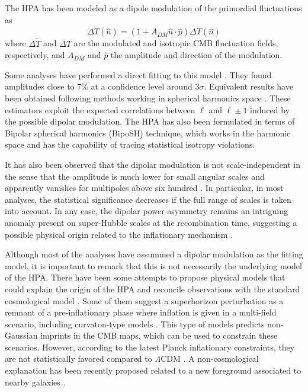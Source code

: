 The HPA has been modeled as a dipole modulation of the primordial fluctuations \cite{2005PhRvD..72j3002G, 2007ApJ...656..636G} as
%
\begin{equation}\label{DM}
    \Delta{\tilde{T}}(\hat{n}) = (1+A_{DM}\hat{n}\cdot\hat{p})\Delta{T}(\hat{n})
\end{equation}
%
where $\Delta{\tilde{T}}$ and $\Delta{T}$ are the modulated and isotropic CMB fluctuation fields, respectively, and $A_{DM}$ and $\hat{p}$ the amplitude and direction of the modulation.

Some analyses have 
performed a direct fitting
to this model \cite{2009ApJ...699..985H, 2007ApJ...660L..81E, 2014A&A...571A..23P, 2017PhRvD..95f3011Z}. They found amplitudes close to 7\% 
at a confidence level
around 3$\sigma$. Equivalent results have been obtained following methods working in 
spherical harmonics space \cite{2015PhRvD..91b3515R, 2009PhRvD..80f3004H, 2016JCAP...01..046G, 2016A&A...594A..16P}. These estimators exploit the expected correlations between $\ell$ and $\ell\pm 1$ induced by the possible dipolar modulation. The HPA has also been formulated in terms of Bipolar spherical harmonics (BipoSH) \cite{2016A&A...594A..16P, 2023arXiv230104539D} technique, which works in the harmonic space and has the capability of tracing 
statistical isotropy violations.

It has also been observed that the dipolar modulation is not scale-independent in the sense that the amplitude is much lower for small angular scales and apparently vanishes for multipoles above six hundred \cite{2009ApJ...704.1448H, Akrami:2014eta, Marcos-Caballero:2019jqj}. In particular, in most analyses, the statistical significance decreases if the full range of scales is taken into account.
In any case, the dipolar power asymmetry remains an intriguing anomaly present on super-Hubble scales at the recombination time, suggesting a possible physical origin related to the inflationary mechanism \cite{2016JCAP...01..046G, 2016A&A...594A..16P}.

Although most of the analyses have assummed a dipolar modulation as the fitting model, it is important to remark that this is not necessarily the underlying model of the HPA. There have been some attempts to propose physical models that could explain the origin of the HPA and reconcile observations with the standard cosmological model \cite{2008PhRvD..78l3520E, 2009PhRvD..80b3526D, 2010PhRvD..81h3501C, 2011JHEP...02..061K, 2013JCAP...08..007L, 2016MNRAS.460.1577K, 2017PhRvD..95f3011Z, 2022arXiv220903928S}. Some of them suggest a superhorizon perturbation as a remnant of a pre-inflationary phase where inflation is given in a multi-field scenario, including curvaton-type models \cite{2008PhRvD..78l3520E}. This type of models predicts non-Gaussian imprints in the CMB maps, which can be used to constrain these scenarios. However, according to the latest Planck inflationary constraints, 
they are not statistically favored compared to $\Lambda$CDM \cite{2020A&A...641A..10P}. A non-cosmological explanation has been recently proposed related to a new foreground associated to nearby galaxies \cite{Hansen:2023gra}.

